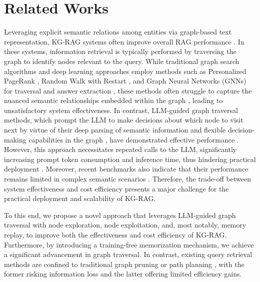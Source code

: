 \section{Related Works}
Leveraging explicit semantic relations among entities via graph-based text representation, KG-RAG systems often improve overall RAG performance \cite{Main2,Main3,KG4,Main12,xie2025pbsm,HippoRAG1.0}. In these systems, information retrieval is typically performed by traversing the graph to identify nodes relevant to the query. While traditional graph search algorithms and deep learning approaches employ methods such as Personalized PageRank \cite{PPR}, Random Walk with Restart \cite{RWR}, and Graph Neural Networks (GNNs) \cite{GNN1, 10.1145/3589334.3645583} for traversal and answer extraction \cite{Main5,KG3,Main9,Cot5}, these methods often struggle to capture the nuanced semantic relationships embedded within the graph \cite{Main6,KG4,LLM-Traverse5}, leading to unsatisfactory system effectiveness. In contrast, LLM-guided graph traversal methods, which prompt the LLM to make decisions about which node to visit next by virtue of their deep parsing of semantic information and flexible decision-making capabilities in the graph \cite{llm-semantic1}, have demonstrated effective performance \cite{KG1,KG2,KG5,li-etal-2025-graphotter}. However, this approach necessitates repeated calls to the LLM, significantly increasing prompt token consumption and inference time, thus hindering practical deployment \cite{Main5,Main8,Main12}. Moreover, recent benchmarks also indicate that their performance remains limited in complex semantic scenarios \cite{Benchmark1}. Therefore, the trade-off between system effectiveness and cost efficiency presents a major challenge for the practical deployment and scalability of KG-RAG. 

To this end, we propose a novel approach that leverages LLM-guided graph traversal with node exploration, node exploitation, and, most notably, memory replay, to improve both the effectiveness and cost efficiency of KG-RAG. Furthermore, by introducing a training-free memorization mechanism, we achieve a significant advancement in graph traversal. In contrast, existing query retrieval methods are confined to traditional graph pruning \cite{KG4,KG7,Main12} or path planning \cite{Main8,KG5,Main2,Main6,LLM-Traverse5}, with the former risking information loss and the latter offering limited efficiency gains.
